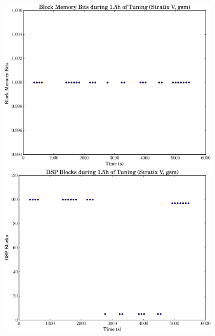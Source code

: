 \documentclass[12pt, a4paper]{article}
\begin{document}
\begin{figure}[htpb]
    \begin{minipage}{.48\textwidth}
        \includegraphics[scale=.25]{gsm_block_5400_chstone_StratixV}
    \end{minipage}%
    \hfill
    \begin{minipage}{.48\textwidth}
        \includegraphics[scale=.25]{gsm_dsp_5400_chstone_StratixV}
    \end{minipage}%


\end{figure}
\end{document}
